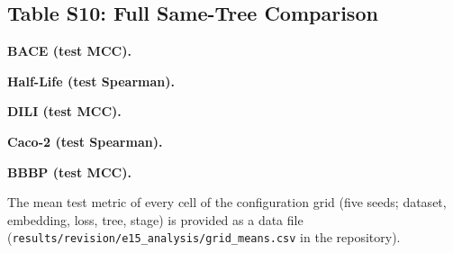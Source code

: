 \documentclass[9pt,a4paper]{article}
\begin{document}
\subsection*{Table S10: Full Same-Tree Comparison}%

\begin{table}[!htbp]
\centering
\caption{Full same-tree comparison for BACE, Half-Life, DILI, Caco-2 and BBBP. Mean $\pm$ SD of the test metric over five seeds for every embedding and loss combination; bold marks the best of the three stages in each row and tree; the last rows give the pooled paired difference with its 95\% interval. All three tree models are included.}
\label{tab:full_sametree}

\textbf{BACE (test MCC).}\par\smallskip
\scriptsize
{}

\bigskip
\textbf{Half-Life (test Spearman).}\par\smallskip
{}

\bigskip
\textbf{DILI (test MCC).}\par\smallskip
{}

\bigskip
\textbf{Caco-2 (test Spearman).}\par\smallskip
{}

\bigskip
\textbf{BBBP (test MCC).}\par\smallskip
{}
\end{table}
\clearpage

The mean test metric of every cell of the configuration grid (five seeds; dataset, embedding, loss, tree, stage) is provided as a data file (\texttt{results/revision/e15\_analysis/grid\_means.csv} in the repository).
\end{document}

